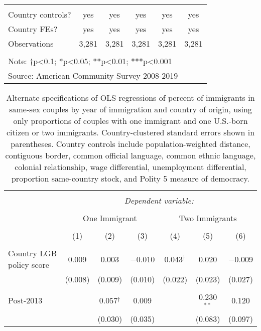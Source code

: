 \documentclass[
  11pt,
]{article}
\begin{document}
\begin{table}[!htbp]
\begin{tabular}{@{\extracolsep{5pt}}lccccc}
  & & & & & \\ 
\hline \\[-1.8ex] 
Country controls? & yes & yes & yes & yes & yes \\ 
Country FEs? & yes & yes & yes & yes & yes \\ 
Observations & 3,281 & 3,281 & 3,281 & 3,281 & 3,281 \\ 
\hline 
\hline \\[-1.8ex] 
\multicolumn{6}{l}{Note: †p<0.1; *p<0.05; **p<0.01; ***p<0.001} \\ 
\multicolumn{6}{l}{Source: American Community Survey 2008-2019} \\ 
\end{tabular} 
\end{table}

\begin{table}[!htbp] \centering 
  \caption{Alternate specifications of OLS regressions of percent of immigrants in same-sex couples by year of immigration and country of origin, using only proportions of couples with one immigrant and one U.S.-born citizen or two immigrants. Country-clustered standard errors shown in parentheses. Country controls include population-weighted distance, contiguous border, common official language, common ethnic language, colonial relationship, wage differential, unemployment differential, proportion same-country stock, and Polity 5 measure of democracy.} 
  \label{tab:country-props-alt2} 
\begin{tabular}{@{\extracolsep{5pt}}lcccccc} 
\\[-1.8ex]\hline 
\hline \\[-1.8ex] 
 & \multicolumn{6}{c}{\textit{Dependent variable:}} \\ 
\cline{2-7} 
\\[-1.8ex] & \multicolumn{3}{c}{One Immigrant} & \multicolumn{3}{c}{Two Immigrants} \\ 
\\[-1.8ex] & (1) & (2) & (3) & (4) & (5) & (6)\\ 
\hline \\[-1.8ex] 
 Country LGB policy score & 0.009 & 0.003 & $-$0.010 & 0.043$^{†}$ & 0.020 & $-$0.009 \\ 
  & (0.008) & (0.009) & (0.010) & (0.022) & (0.023) & (0.027) \\ 
  & & & & & & \\ 
 Post-2013 &  & 0.057$^{†}$ & 0.009 &  & 0.230$^{**}$ & 0.120 \\ 
  &  & (0.030) & (0.035) &  & (0.083) & (0.097) \\ 

\end{tabular}
\end{table}
\end{document}
